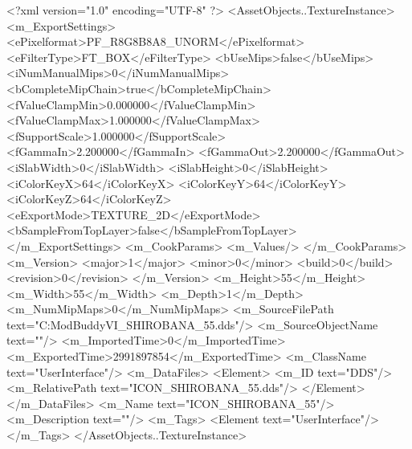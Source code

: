 <?xml version="1.0" encoding="UTF-8" ?>
<AssetObjects..TextureInstance>
	<m_ExportSettings>
		<ePixelformat>PF_R8G8B8A8_UNORM</ePixelformat>
		<eFilterType>FT_BOX</eFilterType>
		<bUseMips>false</bUseMips>
		<iNumManualMips>0</iNumManualMips>
		<bCompleteMipChain>true</bCompleteMipChain>
		<fValueClampMin>0.000000</fValueClampMin>
		<fValueClampMax>1.000000</fValueClampMax>
		<fSupportScale>1.000000</fSupportScale>
		<fGammaIn>2.200000</fGammaIn>
		<fGammaOut>2.200000</fGammaOut>
		<iSlabWidth>0</iSlabWidth>
		<iSlabHeight>0</iSlabHeight>
		<iColorKeyX>64</iColorKeyX>
		<iColorKeyY>64</iColorKeyY>
		<iColorKeyZ>64</iColorKeyZ>
		<eExportMode>TEXTURE_2D</eExportMode>
		<bSampleFromTopLayer>false</bSampleFromTopLayer>
	</m_ExportSettings>
	<m_CookParams>
		<m_Values/>
	</m_CookParams>
	<m_Version>
		<major>1</major>
		<minor>0</minor>
		<build>0</build>
		<revision>0</revision>
	</m_Version>
	<m_Height>55</m_Height>
	<m_Width>55</m_Width>
	<m_Depth>1</m_Depth>
	<m_NumMipMaps>0</m_NumMipMaps>
	<m_SourceFilePath text="C:\Users\asus\Documents\Firaxis ModBuddy\Civilization VI\temppic\ICON_SHIROBANA_55.dds"/>
	<m_SourceObjectName text=""/>
	<m_ImportedTime>0</m_ImportedTime>
	<m_ExportedTime>2991897854</m_ExportedTime>
	<m_ClassName text="UserInterface"/>
	<m_DataFiles>
		<Element>
			<m_ID text="DDS"/>
			<m_RelativePath text="ICON_SHIROBANA_55.dds"/>
		</Element>
	</m_DataFiles>
	<m_Name text="ICON_SHIROBANA_55"/>
	<m_Description text=""/>
	<m_Tags>
		<Element text="UserInterface"/>
	</m_Tags>
</AssetObjects..TextureInstance>

